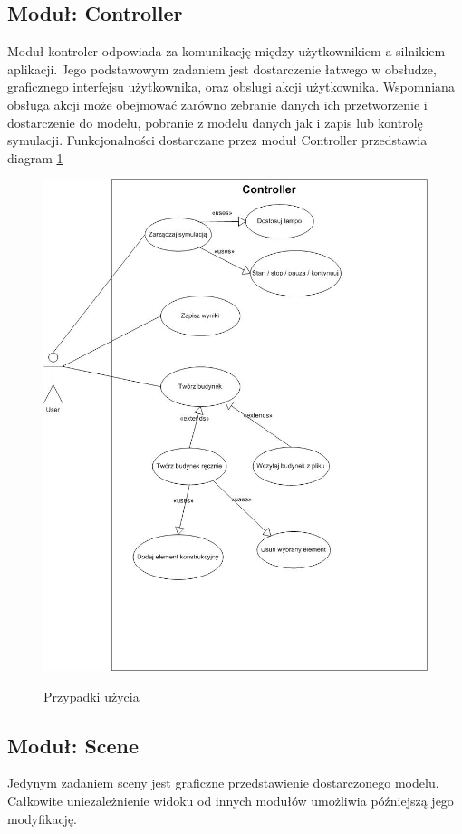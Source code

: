 \subsection{Moduł: Controller}
Moduł kontroler odpowiada za komunikację między użytkownikiem a silnikiem aplikacji. 
Jego podstawowym zadaniem jest dostarczenie łatwego w obsłudze, graficznego interfejsu użytkownika, oraz 
obslugi akcji użytkownika. Wspomniana obsługa akcji może obejmować zarówno zebranie danych ich przetworzenie
i dostarczenie do modelu, pobranie z modelu danych jak i zapis lub kontrolę symulacji.
Funkcjonalności dostarczane przez moduł Controller przedstawia diagram \ref{przypadki uzycia}
\begin{figure}
\begin {center}
\includegraphics{useCase.jpg} \\
\caption { Przypadki użycia}
\label {przypadki uzycia}
\end {center}
\end{figure}

\subsection {Moduł: Scene}
Jedynym zadaniem sceny jest graficzne przedstawienie dostarczonego modelu.
Całkowite uniezależnienie widoku od innych modułów umożliwia późniejszą jego modyfikację.
